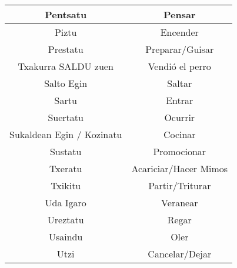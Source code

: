 \documentclass[11pt, a4paper]{article}
\begin{document}
\begin{table}[h]
\begin{tabular}{cc}
		                        Pentsatu                         &                             Pensar                             \\ \hline
		                         Piztu                           &                            Encender                            \\ \hline
		                        Prestatu                         &                        Preparar/Guisar                         \\ \hline
		                  Txakurra SALDU zuen                    &                        Vendió el perro                         \\ \hline
		                       Salto Egin                        &                             Saltar                             \\ \hline
		                         Sartu                           &                             Entrar                             \\ \hline
		                        Suertatu                         &                            Ocurrir                             \\ \hline
		               Sukaldean Egin / Kozinatu                 &                            Cocinar                             \\ \hline
		                        Sustatu                          &                          Promocionar                           \\ \hline
		                        Txeratu                          &                     Acariciar/Hacer Mimos                      \\ \hline
		                        Txikitu                          &                        Partir/Triturar                         \\ \hline
		                       Uda Igaro                         &                            Veranear                            \\ \hline
		                        Ureztatu                         &                             Regar                              \\ \hline
		                        Usaindu                          &                              Oler                              \\ \hline
		                          Utzi                           &                         Cancelar/Dejar                         \\ \hline

\end{tabular}
\end{table}
\end{document}
